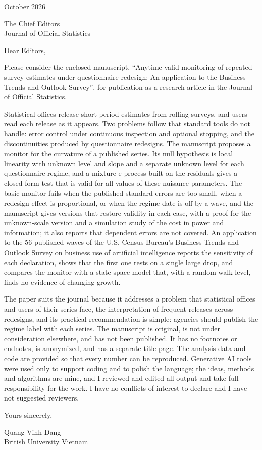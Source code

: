 \documentclass[11pt]{article}
\begin{document}
 October 2026

\medskip\noindent The Chief Editors\\
Journal of Official Statistics

\medskip\noindent Dear Editors,

\medskip\noindent Please consider the enclosed manuscript, ``Anytime-valid monitoring of repeated survey estimates under questionnaire redesign: An application to the Business Trends and Outlook Survey'', for publication as a research article in the Journal of Official Statistics.

\medskip\noindent Statistical offices release short-period estimates from rolling surveys, and users read each release as it appears. Two problems follow that standard tools do not handle: error control under continuous inspection and optional stopping, and the discontinuities produced by questionnaire redesigns. The manuscript proposes a monitor for the curvature of a published series. Its null hypothesis is local linearity with unknown level and slope and a separate unknown level for each questionnaire regime, and a mixture e-process built on the residuals gives a closed-form test that is valid for all values of these nuisance parameters. The basic monitor fails when the published standard errors are too small, when a redesign effect is proportional, or when the regime date is off by a wave, and the manuscript gives versions that restore validity in each case, with a proof for the unknown-scale version and a simulation study of the cost in power and information; it also reports that dependent errors are not covered. An application to the 56 published waves of the U.S. Census Bureau's Business Trends and Outlook Survey on business use of artificial intelligence reports the sensitivity of each declaration, shows that the first one rests on a single large drop, and compares the monitor with a state-space model that, with a random-walk level, finds no evidence of changing growth.

\medskip\noindent The paper suits the journal because it addresses a problem that statistical offices and users of their series face, the interpretation of frequent releases across redesigns, and its practical recommendation is simple: agencies should publish the regime label with each series. The manuscript is original, is not under consideration elsewhere, and has not been published. It has no footnotes or endnotes, is anonymized, and has a separate title page. The analysis data and code are provided so that every number can be reproduced. Generative AI tools were used only to support coding and to polish the language; the ideas, methods and algorithms are mine, and I reviewed and edited all output and take full responsibility for the work. I have no conflicts of interest to declare and I have not suggested reviewers.

\medskip\noindent Yours sincerely,

\medskip\noindent Quang-Vinh Dang\\
British University Vietnam
\end{document}

